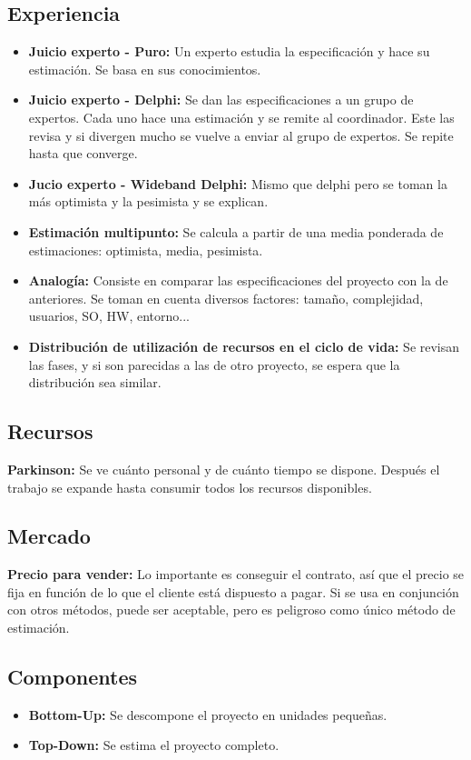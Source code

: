 \documentclass{article}
\begin{document}
\subsection{Experiencia}
\begin{itemize}
	\item \textbf{Juicio experto - Puro:} Un experto estudia la especificación y hace su estimación. Se basa en sus conocimientos.
	\item \textbf{Juicio experto - Delphi:} Se dan las especificaciones a un grupo de expertos. Cada uno hace una estimación y se remite al coordinador. Este las revisa y si divergen mucho se vuelve a enviar al grupo de expertos. Se repite hasta que converge.
	\item \textbf{Jucio experto - Wideband Delphi:} Mismo que delphi pero se toman la más optimista y la pesimista y se explican.
	\item \textbf{Estimación multipunto:} Se calcula a partir de una media ponderada de estimaciones: optimista, media, pesimista. 
	\item \textbf{Analogía:} Consiste en comparar las especificaciones del proyecto con la de anteriores. Se toman en cuenta diversos factores: tamaño, complejidad, usuarios, SO, HW, entorno... 
	\item \textbf{Distribución de utilización de recursos en el ciclo de vida:} Se revisan las fases, y si son parecidas a las de otro proyecto, se espera que la distribución sea similar. 
\end{itemize}

\subsection{Recursos}
\textbf{Parkinson: }Se ve cuánto personal y de cuánto tiempo se dispone. Después el trabajo se expande hasta consumir todos los recursos disponibles. 

\subsection{Mercado}
\textbf{Precio para vender:} Lo importante es conseguir el contrato, así que el precio se fija en función de lo que el cliente está dispuesto a pagar. Si se usa en conjunción con otros métodos, puede ser aceptable, pero es peligroso como único método de estimación. 

\subsection{Componentes}
\begin{itemize}
	\item \textbf{Bottom-Up: }Se descompone el proyecto en unidades pequeñas.
	\item \textbf{Top-Down: }Se estima el proyecto completo.
\end{itemize}
\end{document}
